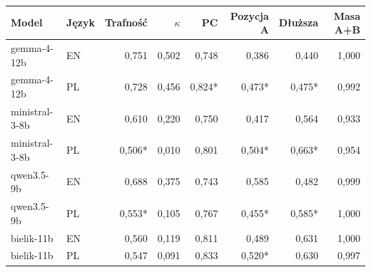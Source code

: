 \begin{tabular}{llrrrrrr}
\toprule
Model & Język & Trafność & $\kappa$ & PC & Pozycja A & Dłuższa & Masa A+B \\
\midrule
gemma-4-12b & EN & 0,751 & 0,502 & 0,748 & 0,386 & 0,440 & 1,000 \\
gemma-4-12b & PL & 0,728 & 0,456 & 0,824* & 0,473* & 0,475* & 0,992 \\
\midrule
ministral-3-8b & EN & 0,610 & 0,220 & 0,750 & 0,417 & 0,564 & 0,933 \\
ministral-3-8b & PL & 0,506* & 0,010 & 0,801 & 0,504* & 0,663* & 0,954 \\
\midrule
qwen3.5-9b & EN & 0,688 & 0,375 & 0,743 & 0,585 & 0,482 & 0,999 \\
qwen3.5-9b & PL & 0,553* & 0,105 & 0,767 & 0,455* & 0,585* & 1,000 \\
\midrule
bielik-11b & EN & 0,560 & 0,119 & 0,811 & 0,489 & 0,631 & 1,000 \\
bielik-11b & PL & 0,547 & 0,091 & 0,833 & 0,520* & 0,630 & 0,997 \\
\bottomrule
\end{tabular}

